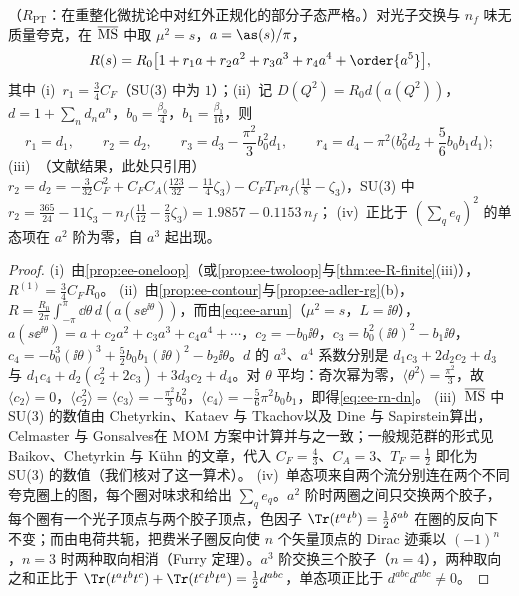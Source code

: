 \begin{corollary}\label{cor:ee-R-alphas}
（$R_{\mathrm{PT}}$：在重整化微扰论中对红外正规化的部分子态严格。）对光子交换与 $n_f$ 味无质量夸克，在 $\overline{\rm MS}$ 中取 $\mu^2=s$，$a=\as(s)/\pi$，
\begin{equation}\label{eq:ee-Rexp}
R(s)=R_0\big[1+r_1a+r_2a^2+r_3a^3+r_4a^4+\order{a^5}\big],
\end{equation}
其中 (i)~$r_1=\frac34C_F$（SU(3) 中为 $1$）；(ii)~记 $D(Q^2)=R_0d(a(Q^2))$，$d=1+\sum_nd_na^n$，$b_0=\frac{\beta_0}4$，$b_1=\frac{\beta_1}{16}$，则
\begin{equation}\label{eq:ee-rn-dn}
r_1=d_1,\qquad r_2=d_2,\qquad r_3=d_3-\frac{\pi^2}3b_0^2d_1,\qquad r_4=d_4-\pi^2\Big(b_0^2d_2+\frac56b_0b_1d_1\Big);
\end{equation}
(iii)~（文献结果，此处只引用）$r_2=d_2=-\frac3{32}C_F^2+C_FC_A\big(\frac{123}{32}-\frac{11}4\zeta_3\big)-C_FT_Fn_f\big(\frac{11}8-\zeta_3\big)$，SU(3) 中 $r_2=\frac{365}{24}-11\zeta_3-n_f\big(\frac{11}{12}-\frac23\zeta_3\big)=1.9857-0.1153\,n_f$；%
(iv)~正比于 $(\sum_qe_q)^2$ 的单态项在 $a^2$ 阶为零，自 $a^3$ 起出现。
\end{corollary}
\begin{proof}
(i)~由\cref{prop:ee-oneloop}（或\cref{prop:ee-twoloop}与\cref{thm:ee-R-finite}(iii)），$R^{(1)}=\frac34C_FR_0$。
(ii)~由\cref{prop:ee-contour}与\cref{prop:ee-adler-rg}(b)，$R=\frac{R_0}{2\pi}\int_{-\pi}^{\pi}\dd\theta\,d(a(s\ee^{\ii\theta}))$，而由\cref{eq:ee-arun}（$\mu^2=s$，$L=\ii\theta$），$a(s\ee^{\ii\theta})=a+c_2a^2+c_3a^3+c_4a^4+\cdots$，$c_2=-b_0\ii\theta$，$c_3=b_0^2(\ii\theta)^2-b_1\ii\theta$，$c_4=-b_0^3(\ii\theta)^3+\frac52b_0b_1(\ii\theta)^2-b_2\ii\theta$。$d$ 的 $a^3$、$a^4$ 系数分别是 $d_1c_3+2d_2c_2+d_3$ 与 $d_1c_4+d_2(c_2^2+2c_3)+3d_3c_2+d_4$。对 $\theta$ 平均：奇次幂为零，$\langle\theta^2\rangle=\frac{\pi^2}3$，故 $\langle c_2\rangle=0$，$\langle c_2^2\rangle=\langle c_3\rangle=-\frac{\pi^2}3b_0^2$，$\langle c_4\rangle=-\frac56\pi^2b_0b_1$，即得\cref{eq:ee-rn-dn}。
(iii)~$\overline{\rm MS}$ 中 SU(3) 的数值由 Chetyrkin、Kataev 与 Tkachov\cite{ChetyrkinKataevTkachov1979}以及 Dine 与 Sapirstein\cite{DineSapirstein1979}算出，Celmaster 与 Gonsalves\cite{CelmasterGonsalves1980a}在 MOM 方案中计算并与之一致；一般规范群的形式见 Baikov、Chetyrkin 与 Kühn 的文章\cite{Baikov:2010je}，代入 $C_F=\frac43$、$C_A=3$、$T_F=\frac12$ 即化为 SU(3) 的数值（我们核对了这一算术）。
(iv)~单态项来自两个流分别连在两个不同夸克圈上的图，每个圈对味求和给出 $\sum_qe_q$。$a^2$ 阶时两圈之间只交换两个胶子，每个圈有一个光子顶点与两个胶子顶点，色因子 $\Tr(t^at^b)=\frac12\delta^{ab}$ 在圈的反向下不变；而由电荷共轭，把费米子圈反向使 $n$ 个矢量顶点的 Dirac 迹乘以 $(-1)^n$，$n=3$ 时两种取向相消（Furry 定理\cite{Furry:1937zz}）。$a^3$ 阶交换三个胶子（$n=4$），两种取向之和正比于 $\Tr(t^at^bt^c)+\Tr(t^ct^bt^a)=\frac12d^{abc}$，单态项正比于 $d^{abc}d^{abc}\ne0$。
\end{proof}
